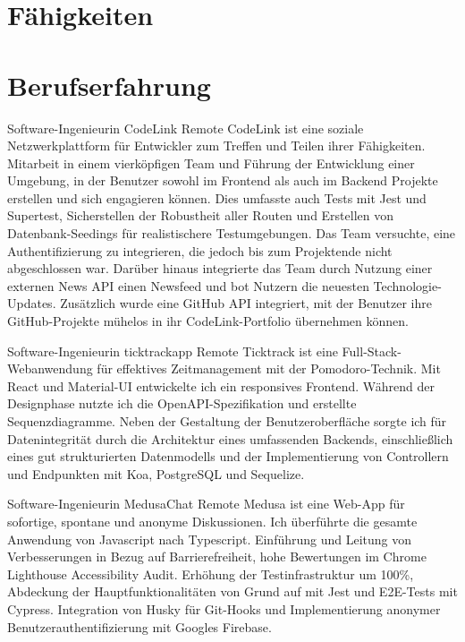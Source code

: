 \section{Fähigkeiten}

\section{Berufserfahrung}
  {Software-Ingenieurin}
  {CodeLink}
  {Remote}
  {}
  {
    CodeLink ist eine soziale Netzwerkplattform für Entwickler zum Treffen und Teilen ihrer Fähigkeiten.
    Mitarbeit in einem vierköpfigen Team und Führung der Entwicklung einer Umgebung, in der Benutzer sowohl im Frontend als auch im Backend Projekte erstellen und sich engagieren können. 
    Dies umfasste auch Tests mit Jest und Supertest, Sicherstellen der Robustheit aller Routen und Erstellen von Datenbank-Seedings für realistischere Testumgebungen.
    Das Team versuchte, eine Authentifizierung zu integrieren, die jedoch bis zum Projektende nicht abgeschlossen war.
    Darüber hinaus integrierte das Team durch Nutzung einer externen News API einen Newsfeed und bot Nutzern die neuesten Technologie-Updates. Zusätzlich wurde eine GitHub API integriert, mit der Benutzer ihre GitHub-Projekte mühelos in ihr CodeLink-Portfolio übernehmen können.
  }

  {Software-Ingenieurin}
  {ticktrackapp}
  {Remote}
  {}
  {
    Ticktrack ist eine Full-Stack-Webanwendung für effektives Zeitmanagement mit der Pomodoro-Technik.
    Mit React und Material-UI entwickelte ich ein responsives Frontend. 
    Während der Designphase nutzte ich die OpenAPI-Spezifikation und erstellte Sequenzdiagramme.
    Neben der Gestaltung der Benutzeroberfläche sorgte ich für Datenintegrität durch die Architektur eines umfassenden Backends, einschließlich eines gut strukturierten Datenmodells und der Implementierung von Controllern und Endpunkten mit Koa, PostgreSQL und Sequelize.
  }

  {Software-Ingenieurin}
  {MedusaChat}
  {Remote}
  {}
  {
    Medusa ist eine Web-App für sofortige, spontane und anonyme Diskussionen.
    Ich überführte die gesamte Anwendung von Javascript nach Typescript.
    Einführung und Leitung von Verbesserungen in Bezug auf Barrierefreiheit, hohe Bewertungen im Chrome Lighthouse Accessibility Audit. 
    Erhöhung der Testinfrastruktur um 100\%, Abdeckung der Hauptfunktionalitäten von Grund auf mit Jest und E2E-Tests mit Cypress. 
    Integration von Husky für Git-Hooks und Implementierung anonymer Benutzerauthentifizierung mit Googles Firebase.
  }

